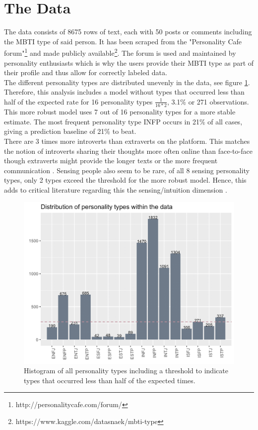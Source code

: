 \section{The Data}
\label{sec:data}
The data consists of 8675 rows of text, each with 50 posts or comments including the MBTI type of said person. It has been scraped from the "Personality Cafe forum"\footnote{http://personalitycafe.com/forum/} and made publicly available\footnote{https://www.kaggle.com/datasnaek/mbti-type}. The forum is used and maintained by personality enthusiasts which is why the users provide their MBTI type as part of their profile and thus allow for correctly labeled data.\\
The different personality types are distributed unevenly in the data, see figure \ref{fig:Hist}. Therefore, this analysis includes a model without types that occurred less than half of the expected rate for 16 personality types $\frac{1}{16 * 2}$, 3.1\% or 271 observations. This more robust model uses 7 out of 16 personality types for a more stable estimate. The most frequent personality type INFP occurs in 21\% of all cases, giving a prediction baseline of 21\% to beat.\\
There are 3 times more introverts than extraverts on the platform. This matches the notion of introverts sharing their thoughts more often online than face-to-face \cite{goby_personality_2006} though extraverts might provide the longer texts or the more frequent communication \cite{seidman_self-presentation_2013}. Sensing people also seem to be rare, of all 8 sensing personality types, only 2 types exceed the threshold for the more robust model. Hence, this adds to critical literature regarding this the sensing/intuition dimension \cite{boyle_myers-briggs_1995}.

\begin{figure}
\centering
  \includegraphics[scale=0.4]{histogram.png}
\caption{Histogram of all personality types including a threshold to indicate types that occurred less than half of the expected times.}
\label{fig:Hist}
\end{figure}


